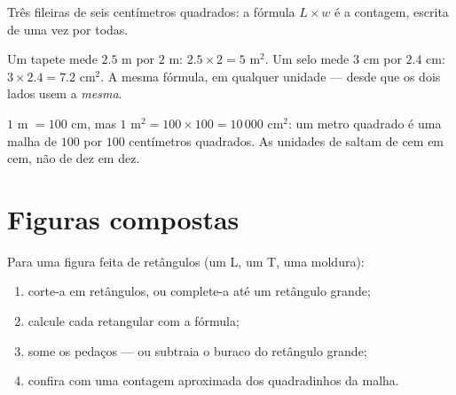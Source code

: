 \begin{omfigure}

{\small Três fileiras de seis centímetros quadrados: a fórmula
$L \times w$ é a contagem, escrita de uma vez por todas.}
\end{omfigure}

\begin{example}\label{ex:g5:areas:rectangle}
Um tapete mede $2.5$ m por $2$ m:  $2.5 \times 2 = 5$ m$^2$. Um
selo mede $3$ cm por $2.4$ cm:  $3 \times 2.4 = 7.2$ cm$^2$. A
mesma fórmula, em qualquer unidade --- desde que os dois lados usem a
\emph{mesma}.
\end{example}

\begin{example}\label{ex:g5:areas:units}
$1$ m $= 100$ cm, mas $1$ m$^2 = 100 \times 100 = 10\,000$ cm$^2$:
um metro quadrado é uma malha de $100$ por $100$ centímetros
quadrados. As unidades de  saltam de cem em cem, não de dez em
dez.
\end{example}

\section{Figuras compostas}

\begin{method}\label{met:g5:areas:composite}
Para uma figura feita de retângulos (um L, um T, uma moldura):
\begin{enumerate}
  \item corte-a em retângulos, ou complete-a até um retângulo
        grande;
  \item calcule cada  retangular com a fórmula;
  \item some os pedaços --- ou subtraia o buraco do retângulo
        grande;
  \item confira com uma contagem aproximada dos quadradinhos da
        malha.
\end{enumerate}
\end{method}

